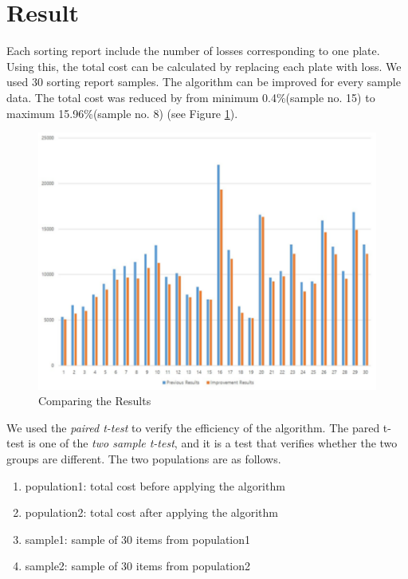 \section{Result}\label{sec:Result}

Each sorting report include the number of losses corresponding to one plate. 
Using this, the total cost can be calculated by replacing each plate with loss. 
We used 30 sorting report samples. The algorithm can be improved for every sample data.
The total cost was reduced by from minimum 0.4\%(sample no. 15) to maximum 15.96\%(sample no. 8) (see Figure \ref{fig:Comparing}).

\begin{figure}[h!]
	\centering
	\includegraphics[width=\linewidth]{Comparing.pdf}
	\caption{Comparing the Results}
	\label{fig:Comparing}       %
\end{figure}

We used the {\it paired t-test} to verify the efficiency of the algorithm. The pared t-test is one of the {\it two sample t-test}, and it is a test that verifies whether the two groups are different. The two populations are as follows.

\begin{enumerate}[$\bullet$]
	\item population1: total cost before applying the algorithm
	\item population2: total cost after applying the algorithm
	\item sample1: sample of 30 items from population1
	\item sample2: sample of 30 items from population2
\end{enumerate}

